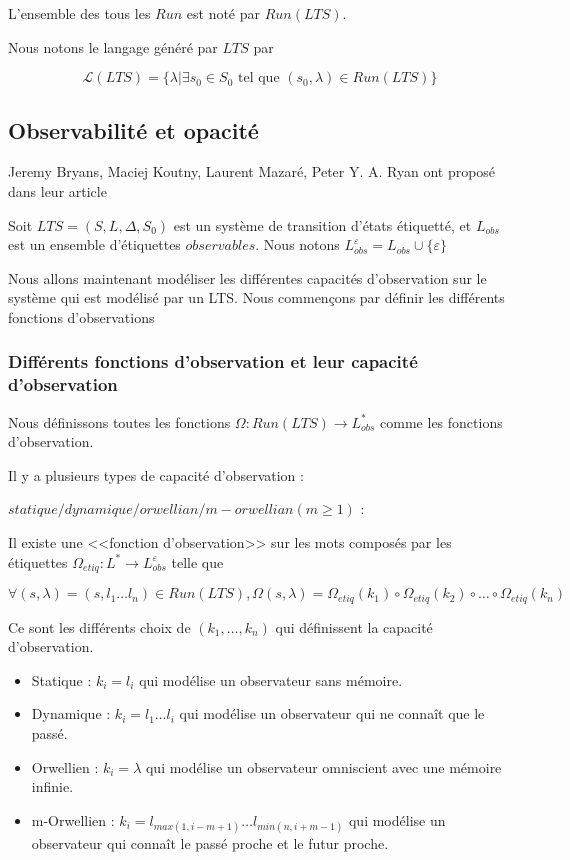 \documentclass[10pt,a4paper]{article}
\begin{document}
L'ensemble des tous les $Run$ est not\'e par $Run(LTS)$.

Nous notons le langage g\'en\'er\'e par $LTS$ par 

$$\mathcal{L}(LTS) = \{\lambda | \exists s_0 \in S_0 \mbox{ tel que } (s_0,\lambda) \in Run(LTS)\}$$


\subsection{Observabilit\'e et opacit\'e}

Jeremy Bryans, Maciej Koutny, Laurent Mazar{\'{e}}, Peter Y. A. Ryan ont propos\'e dans leur article ~\cite{BryansKMR08}

Soit $LTS=(S,L,\Delta,S_0)$ est un syst\`eme de transition d'\'etats étiquetté, et $L_{obs}$ est un ensemble d'étiquettes $observables$. Nous notons $L_{obs}^{\varepsilon} = L_{obs} \cup \{\varepsilon\}$

Nous allons maintenant mod\'eliser les diff\'erentes capacit\'es d'observation sur le syst\`eme qui est mod\'elis\'e par un LTS. Nous commen\c cons par d\'efinir les diff\'erents fonctions d'observations

\subsubsection{Diff\'erents fonctions d'observation et leur capacit\'e d'observation}

Nous d\'efinissons toutes les fonctions $\Omega : Run(LTS) \rightarrow L_{obs}^*$ comme les fonctions   
 d'observation.
 
Il y a plusieurs types de capacit\'e d'observation : 


$statique/dynamique/orwellian/m-orwellian(m\geq 1)$ :
		
Il existe une <<fonction d'observation>> sur les mots compos\'es par les \'etiquettes $\Omega_{etiq} : L^* \rightarrow L_{obs}^{\varepsilon}$ telle que 
	
	$$\forall (s,\lambda)= (s,l_1\dots l_n) \in Run(LTS), \Omega(s,\lambda) = \Omega_{etiq}(k_1)\circ\Omega_{etiq}(k_2)\circ\dots\circ\Omega_{etiq}(k_n)$$
	
	Ce sont les diff\'erents choix de $(k_1,\dots, k_n)$ qui d\'efinissent la capacit\'e d'observation.


\begin{itemize}
        \item Statique : $k_i = l_i$ qui modélise un observateur sans mémoire.
	\item Dynamique : $k_i = l_1 \dots l_i$ qui modélise un observateur qui ne connaît que le passé.
	\item Orwellien : $k_i = \lambda$ qui modélise un observateur omniscient avec une mémoire infinie.
	\item m-Orwellien : $k_i = l_{max(1,i-m+1)} \dots l_{min(n,i+m-1)}$ qui modélise un observateur qui connaît le passé proche et le futur proche.

\end{itemize}
\end{document}
